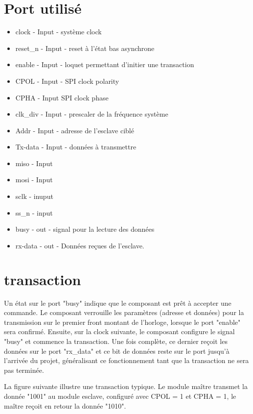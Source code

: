 \documentclass[french,a4paper,12pt]{report}
\begin{document}
	\section{Port utilisé}
		\begin{itemize}
			\item clock - Input - système clock
			\item reset\_n - Input - reset à l'état bas asynchrone
			\item enable - Input - loquet permettant d'initier une transaction
			\item CPOL - Input - SPI clock polarity
			\item CPHA - Input SPI clock phase
			\item clk\_div - Input - prescaler de la fréquence système
			\item Addr - Input - adresse de l'esclave ciblé
			\item Tx-data - Input - données à transmettre
			\item miso - Input
			\item mosi - Input
			\item sclk - inuput
			\item  ss\_n - input
			\item busy - out - signal pour la lecture des données
			\item rx-data - out - Données reçues de l'esclave.
		\end{itemize}
	
	\section{transaction}
		Un état sur le port "busy" indique que le composant est prêt à accepter une commande. Le composant verrouille les paramètres (adresse et données) pour la transmission sur le premier front montant de l'horloge, lorsque le port "enable" sera confirmé. Ensuite, sur la clock suivante, le composant configure le signal "busy" et commence la transaction. Une fois complète, ce dernier reçoit les données sur le port "rx\_data" et ce bit de données reste sur le port jusqu'à l'arrivée du projet, généralisant ce fonctionnement tant que la transaction ne sera pas terminée.		
		
		La figure suivante illustre une transaction typique. Le module maître transmet la donnée "1001" au module esclave, configuré avec CPOL = 1 et CPHA = 1, le maître reçoit en retour la donnée "1010".
		
\end{document}
